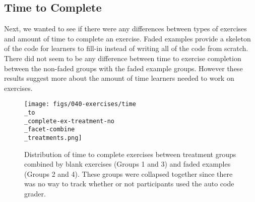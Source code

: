 \documentclass[040-assessment.tex]{subfiles}
\begin{document}
\subsection{Time to Complete}

    Next, we wanted to see if there were any differences between types of exercises and amount of time to complete an exercise.
    Faded examples provide a skeleton of the code for learners to fill-in instead of writing all of the code from scratch.
    There did not seem to be any difference between time to exercise completion between the non-faded groups with the
    faded example groups.
    However these results suggest more about the amount of time learners needed to work on exercises.

    \begin{figure}[!htbp]
        \centering
        \texttt{[image: figs/040-exercises/time\\\_to\\\_complete-ex-treatment-no\\\_facet-combine\\\_treatments.png]}
        \caption[Time to complete exercises with combined treatment groups]
        {Distribution of time to complete exercises between treatment groups combined by
        blank exercises (Groups 1 and 3) and faded examples (Groups 2 and 4).
        These groups were collapsed together since there was no way to track whether or not
        participants used the auto code grader.
        }
        \label{fig:time-to-complete-combined-treatments}
    \end{figure}
\end{document}
